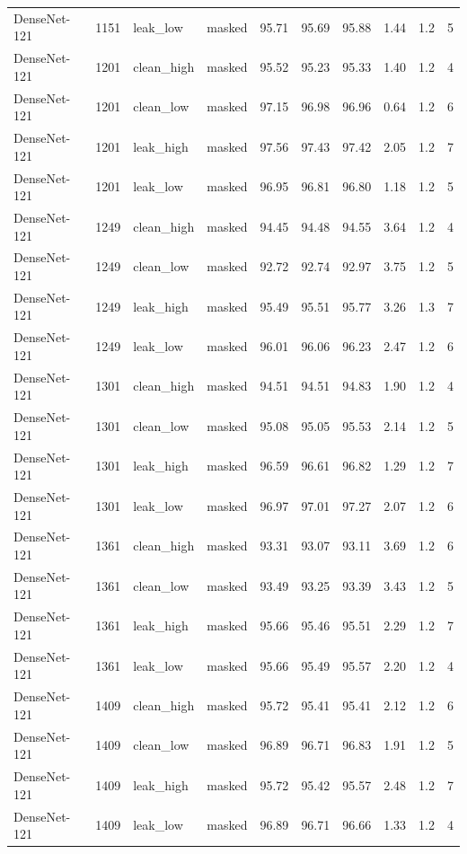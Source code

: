 {\begin{longtable}{lrllrrrrrr}
DenseNet-121 & 1151 & leak\_low & masked & 95.71 & 95.69 & 95.88 & 1.44 & 1.2 & 5 \\
DenseNet-121 & 1201 & clean\_high & masked & 95.52 & 95.23 & 95.33 & 1.40 & 1.2 & 4 \\
DenseNet-121 & 1201 & clean\_low & masked & 97.15 & 96.98 & 96.96 & 0.64 & 1.2 & 6 \\
DenseNet-121 & 1201 & leak\_high & masked & 97.56 & 97.43 & 97.42 & 2.05 & 1.2 & 7 \\
DenseNet-121 & 1201 & leak\_low & masked & 96.95 & 96.81 & 96.80 & 1.18 & 1.2 & 5 \\
DenseNet-121 & 1249 & clean\_high & masked & 94.45 & 94.48 & 94.55 & 3.64 & 1.2 & 4 \\
DenseNet-121 & 1249 & clean\_low & masked & 92.72 & 92.74 & 92.97 & 3.75 & 1.2 & 5 \\
DenseNet-121 & 1249 & leak\_high & masked & 95.49 & 95.51 & 95.77 & 3.26 & 1.3 & 7 \\
DenseNet-121 & 1249 & leak\_low & masked & 96.01 & 96.06 & 96.23 & 2.47 & 1.2 & 6 \\
DenseNet-121 & 1301 & clean\_high & masked & 94.51 & 94.51 & 94.83 & 1.90 & 1.2 & 4 \\
DenseNet-121 & 1301 & clean\_low & masked & 95.08 & 95.05 & 95.53 & 2.14 & 1.2 & 5 \\
DenseNet-121 & 1301 & leak\_high & masked & 96.59 & 96.61 & 96.82 & 1.29 & 1.2 & 7 \\
DenseNet-121 & 1301 & leak\_low & masked & 96.97 & 97.01 & 97.27 & 2.07 & 1.2 & 6 \\
DenseNet-121 & 1361 & clean\_high & masked & 93.31 & 93.07 & 93.11 & 3.69 & 1.2 & 6 \\
DenseNet-121 & 1361 & clean\_low & masked & 93.49 & 93.25 & 93.39 & 3.43 & 1.2 & 5 \\
DenseNet-121 & 1361 & leak\_high & masked & 95.66 & 95.46 & 95.51 & 2.29 & 1.2 & 7 \\
DenseNet-121 & 1361 & leak\_low & masked & 95.66 & 95.49 & 95.57 & 2.20 & 1.2 & 4 \\
DenseNet-121 & 1409 & clean\_high & masked & 95.72 & 95.41 & 95.41 & 2.12 & 1.2 & 6 \\
DenseNet-121 & 1409 & clean\_low & masked & 96.89 & 96.71 & 96.83 & 1.91 & 1.2 & 5 \\
DenseNet-121 & 1409 & leak\_high & masked & 95.72 & 95.42 & 95.57 & 2.48 & 1.2 & 7 \\
DenseNet-121 & 1409 & leak\_low & masked & 96.89 & 96.71 & 96.66 & 1.33 & 1.2 & 4 \\

\end{longtable}}
